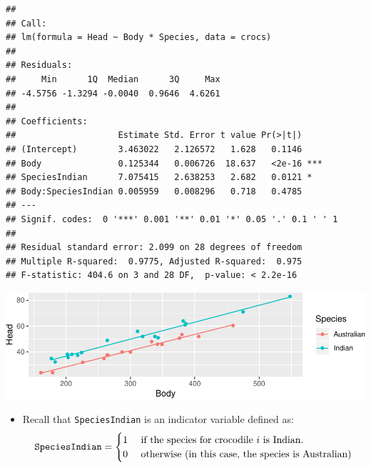 \documentclass[]{article}
\newenvironment{Shaded}{\begin{snugshade}}{\end{snugshade}}
\newcommand{\KeywordTok}[1]{\textcolor[rgb]{0.13,0.29,0.53}{\textbf{#1}}}
\newcommand{\DataTypeTok}[1]{\textcolor[rgb]{0.13,0.29,0.53}{#1}}
\newcommand{\StringTok}[1]{\textcolor[rgb]{0.31,0.60,0.02}{#1}}
\newcommand{\OperatorTok}[1]{\textcolor[rgb]{0.81,0.36,0.00}{\textbf{#1}}}
\newcommand{\NormalTok}[1]{#1}
\providecommand{\tightlist}{%
  \setlength{\itemsep}{0pt}\setlength{\parskip}{0pt}}
\begin{document}
\begin{verbatim}
## 
## Call:
## lm(formula = Head ~ Body * Species, data = crocs)
## 
## Residuals:
##     Min      1Q  Median      3Q     Max 
## -4.5756 -1.3294 -0.0040  0.9646  4.6261 
## 
## Coefficients:
##                    Estimate Std. Error t value Pr(>|t|)    
## (Intercept)        3.463022   2.126572   1.628   0.1146    
## Body               0.125344   0.006726  18.637   <2e-16 ***
## SpeciesIndian      7.075415   2.638253   2.682   0.0121 *  
## Body:SpeciesIndian 0.005959   0.008296   0.718   0.4785    
## ---
## Signif. codes:  0 '***' 0.001 '**' 0.01 '*' 0.05 '.' 0.1 ' ' 1
## 
## Residual standard error: 2.099 on 28 degrees of freedom
## Multiple R-squared:  0.9775, Adjusted R-squared:  0.975 
## F-statistic: 404.6 on 3 and 28 DF,  p-value: < 2.2e-16
\end{verbatim}

\begin{Shaded}
\end{Shaded}

\includegraphics{20190329_two_lines_files/figure-latex/unnamed-chunk-6-1.pdf}

\begin{itemize}
\tightlist
\item
  Recall that \texttt{SpeciesIndian} is an indicator variable defined
  as:
  \[\text{{\tt SpeciesIndian}} = \begin{cases} 1 & \text{ if the species for crocodile $i$ is Indian.} \\
  0 & \text{ otherwise (in this case, the species is Australian)} \end{cases}
  \]
\end{itemize}
\end{document}
